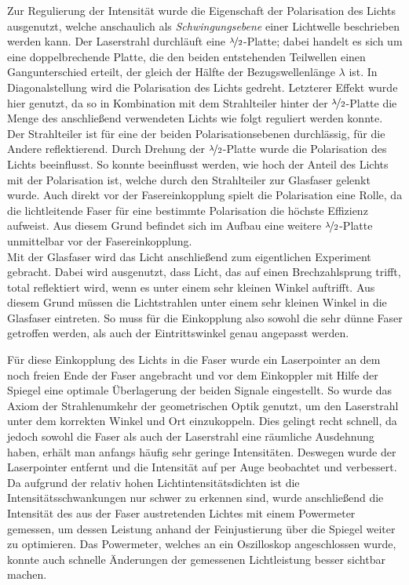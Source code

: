  Zur Regulierung der Intensität wurde die Eigenschaft der Polarisation des Lichts ausgenutzt, welche anschaulich als \textit{Schwingungsebene} einer Lichtwelle beschrieben werden kann. Der Laserstrahl durchläuft eine $\nicefrac{\lambda}{2}$-Platte; dabei handelt es sich um eine doppelbrechende Platte, die den beiden entstehenden Teilwellen einen Gangunterschied erteilt, der gleich der Hälfte der Bezugswellenlänge $\lambda$ ist. In Diagonalstellung wird die Polarisation des Lichts gedreht. Letzterer Effekt wurde hier genutzt, da so in Kombination mit dem Strahlteiler hinter der $\nicefrac{\lambda}{2}$-Platte die Menge des anschließend verwendeten Lichts wie folgt reguliert werden konnte. Der Strahlteiler ist für eine der beiden Polarisationsebenen durchlässig, für die Andere reflektierend. Durch Drehung der $\nicefrac{\lambda}{2}$-Platte wurde die Polarisation des Lichts beeinflusst. So konnte beeinflusst werden, wie hoch der Anteil des Lichts mit der Polarisation ist, welche durch den Strahlteiler zur Glasfaser gelenkt wurde. Auch direkt vor der Fasereinkopplung spielt die Polarisation eine Rolle, da die lichtleitende Faser für eine bestimmte Polarisation die höchste Effizienz aufweist. Aus diesem Grund befindet sich im Aufbau eine weitere $\nicefrac{\lambda}{2}$-Platte unmittelbar vor der Fasereinkopplung.\\

Mit der Glasfaser wird das Licht anschließend zum eigentlichen Experiment gebracht. Dabei wird ausgenutzt, dass Licht, das auf einen Brechzahlsprung trifft, total reflektiert wird, wenn es unter einem sehr kleinen Winkel auftrifft. Aus diesem Grund müssen die Lichtstrahlen unter einem sehr kleinen Winkel in die Glasfaser eintreten. So muss für die Einkopplung also sowohl die sehr dünne Faser getroffen werden, als auch der Eintrittswinkel genau angepasst werden.

Für diese Einkopplung des Lichts in die Faser wurde ein Laserpointer an dem noch freien Ende der Faser angebracht und vor dem Einkoppler mit Hilfe der Spiegel eine optimale Überlagerung der beiden Signale eingestellt. So wurde das Axiom der Strahlenumkehr der geometrischen Optik genutzt, um den Laserstrahl unter dem korrekten Winkel und Ort einzukoppeln. Dies gelingt recht schnell, da jedoch sowohl die Faser als auch der Laserstrahl eine räumliche Ausdehnung haben, erhält man anfangs häufig sehr geringe Intensitäten. Deswegen wurde der Laserpointer entfernt und die Intensität auf per Auge beobachtet und verbessert. Da aufgrund der relativ hohen Lichtintensitätsdichten ist die Intensitätsschwankungen  nur schwer zu erkennen sind, wurde anschließend die Intensität des aus der Faser austretenden Lichtes mit einem Powermeter gemessen, um dessen Leistung anhand der Feinjustierung über die Spiegel weiter zu optimieren. Das Powermeter, welches an ein Oszilloskop angeschlossen wurde, konnte auch schnelle Änderungen der gemessenen Lichtleistung besser sichtbar machen.

